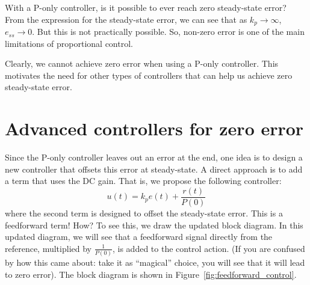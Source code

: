 \documentclass{ee122_notes}
\begin{document}
\begin{popquiz}
    With a P-only controller, is it possible to ever reach zero steady-state error? 
\popqsplit
From the expression for the steady-state error, we can see that as $k_p \to \infty$, $e_{ss} \to 0$. But this is not practically possible. So, non-zero error is one of the main limitations of proportional control.
\end{popquiz}
Clearly, we cannot achieve zero error when using a P-only controller. This motivates the need for other types of controllers that can help us achieve zero steady-state error. 

\section{Advanced controllers for zero error}
Since the P-only controller leaves out an error at the end, one idea is to design a new controller that offsets this error at steady-state. A direct approach is to add a term that uses the DC gain. That is, we propose the following controller:
\[
    u(t) = k_p e(t) + \frac{r(t)}{P(0)}
\]  
where the second term is designed to offset the steady-state error. This is a feedforward term! How? To see this, we draw the updated block diagram. In this updated diagram, we will see that a feedforward signal directly from the reference, multiplied by $\frac{1}{P(0)}$, is added to the control action. (If you are confused by how this came about: take it as ``magical'' choice, you will see that it will lead to zero error). The block diagram is shown in Figure~\ref{fig:feedforward_control}.
\end{document}
